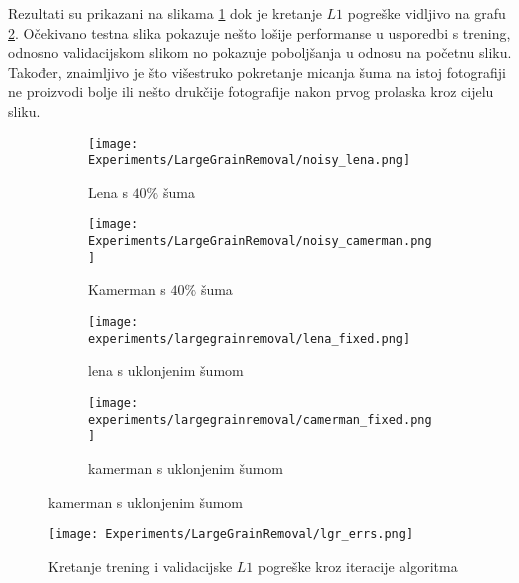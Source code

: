 Rezultati su prikazani na slikama \ref{fig:large_sp_result_grid} dok je kretanje $L1$ pogreške vidljivo na grafu \ref{graph:large_sp_train_val_loss}.
Očekivano testna slika pokazuje nešto lošije performanse u usporedbi s trening, odnosno validacijskom slikom no pokazuje poboljšanja u odnosu na početnu sliku.
Također, znaimljivo je što višestruko pokretanje micanja šuma na istoj fotografiji ne proizvodi bolje ili nešto drukčije fotografije nakon prvog prolaska kroz cijelu sliku.

\begin{figure}
	\centering
	\caption{Fotografije lene i fotografa prije i poslije micanja šuma koji prekriva $40\%$ slike}
	\begin{subfigure}[t]{0.35\textwidth}
		\texttt{[image: Experiments/LargeGrainRemoval/noisy\_lena.png]}
		\caption{Lena s $40\%$ šuma}
	\end{subfigure}
	\begin{subfigure}[t]{0.35\textwidth}
		\texttt{[image: Experiments/LargeGrainRemoval/noisy\_camerman.png]}
		\caption{Kamerman s $40\%$ šuma}
	\end{subfigure}
	\begin{subfigure}[t]{0.35\textwidth}
		\texttt{[image: experiments/largegrainremoval/lena\_fixed.png]}
		\caption{lena s uklonjenim šumom}
	\end{subfigure}
	\begin{subfigure}[t]{0.35\textwidth}
		\texttt{[image: experiments/largegrainremoval/camerman\_fixed.png]}
		\caption{kamerman s uklonjenim šumom}
	\end{subfigure}
	\label{fig:large_sp_result_grid}
\end{figure}

\begin{figure}
	\centering
	\texttt{[image: Experiments/LargeGrainRemoval/lgr\_errs.png]}
	\caption{Kretanje trening i validacijske $L1$ pogreške kroz iteracije algoritma}
	\label{graph:large_sp_train_val_loss}
\end{figure}
